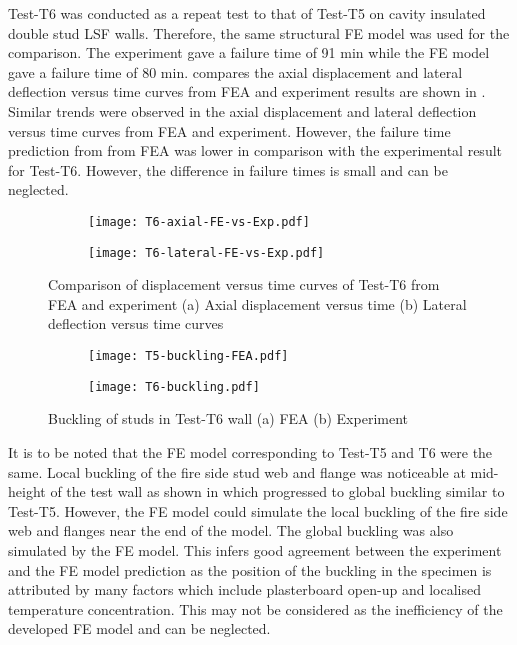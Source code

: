 Test-T6 was conducted as a repeat test to that of Test-T5 on cavity insulated double stud LSF walls. Therefore, the same structural FE model was used for the comparison. The experiment gave a failure time of 91 min while the FE model gave a failure time of 80 min.  compares the axial displacement and lateral deflection versus time curves from FEA and experiment results are shown in . Similar trends were observed in the axial displacement and lateral deflection versus time curves from FEA and experiment. However, the failure time prediction from from FEA was lower in comparison with the experimental result for Test-T6. However, the difference in failure times is small and can be neglected.   
\begin{figure}[!htbp]
	\centering
	\begin{subfigure}[b]{0.7\textwidth}
		\centering
		\texttt{[image: T6-axial-FE-vs-Exp.pdf]}
		\caption{}
		\label{subfig:T6-axial-FE-vs-Exp}
	\end{subfigure}
	\begin{subfigure}[b]{0.7\textwidth}
		\centering
		\texttt{[image: T6-lateral-FE-vs-Exp.pdf]}
		\caption{}
		\label{subfig:T6-lateral-FE-vs-Exp}
	\end{subfigure}
	   \caption{Comparison of displacement versus time curves of Test-T6 from FEA and experiment (a) Axial displacement versus time (b) Lateral deflection versus time curves}
	   \label{fig:T6-structural-FE-vs-Exp}
\end{figure}    
\begin{figure}[!htbp]
	\centering
	\begin{subfigure}[b]{0.85\textwidth}
		\centering
		\texttt{[image: T5-buckling-FEA.pdf]}
		\caption{}
		\label{subfig:T6-buckling-FEA}
	\end{subfigure}
	\begin{subfigure}[b]{0.35\textwidth}
		\centering
		\texttt{[image: T6-buckling.pdf]}
		\caption{}
		\label{subfig:T6-buckling-FEA-Exp}
	\end{subfigure}
	   \caption{Buckling of studs in Test-T6 wall (a) FEA (b) Experiment}
	   \label{fig:T6-buckling-FE-vs-Exp}
\end{figure} 

It is to be noted that the FE model corresponding to Test-T5 and T6 were the same. Local buckling of the fire side stud web and flange was noticeable at mid-height of the test wall as shown in  which progressed to global buckling similar to Test-T5. However, the FE model could simulate the local buckling of the fire side web and flanges near the end of the model. The global buckling was also simulated by the FE model. This infers good agreement between the experiment and the FE model prediction as the position of the buckling in the specimen is attributed by many factors which include plasterboard open-up and localised temperature concentration. This may not be considered as the inefficiency of the developed FE model and can be neglected.

